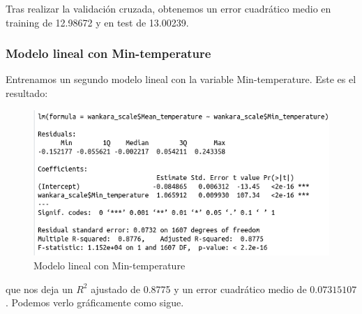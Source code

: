 Tras realizar la validación cruzada, obtenemos un error cuadrático medio en training de 12.98672 y en test de 13.00239.

\subsubsection{Modelo lineal con Min-temperature}

Entrenamos un segundo modelo lineal con la variable Min-temperature. Este es el resultado:

\begin{figure}[H] %
	\centering
	\includegraphics[scale=0.735]{lm2.png}  %
	\caption{Modelo lineal con Min-temperature} 
	\label{fig:lm2}
\end{figure}

que nos deja un $R^2$ ajustado de 0.8775 y un error cuadrático medio de $0.07315107$. Podemos verlo gráficamente como sigue.

